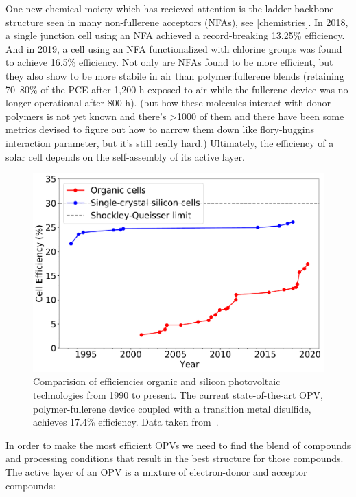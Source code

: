 One new chemical moiety which has recieved attention is the ladder backbone structure seen in many non-fullerene acceptors (NFAs), see \autoref{chemistries}.
In 2018, a single junction cell using an NFA achieved a record-breaking 13.25\% efficiency\cite{raynergy}.
And in 2019, a cell using an NFA functionalized with chlorine groups was found to achieve 16.5\% efficiency\cite{Cui2019}. 
Not only are NFAs found to be more efficient, but they also show to be more stabile in air than polymer:fullerene blends (retaining 70--80\% of the PCE after 1,200 h exposed to air while the fullerene device was no longer operational after 800 h)\cite{Baran2017}.
(but how these molecules interact with donor polymers is not yet known and there's >1000 of them and there have been some metrics devised to figure out how to narrow them down like flory-huggins interaction parameter, but it's still really hard.) \cite{Gao2020} %
Ultimately, the efficiency of a solar cell depends on the self-assembly of its active layer. 

\begin{figure}[h!]
    \centering
    \includegraphics[width=0.8\linewidth]{images/NREL2020.pdf}
    \caption{Comparision of efficiencies organic and silicon photovoltaic technologies from 1990 to present. The current state-of-the-art OPV, polymer-fullerene device coupled with a transition metal disulfide, achieves 17.4\% efficiency\cite{Lin2019}. Data taken from~\cite{NREL2020}.}\label{nrel}
\end{figure}

In order to make the most efficient OPVs we need to find the blend of compounds and processing conditions that result in the best structure for those compounds.
The active layer of an OPV is a mixture of electron-donor and acceptor compounds: 

